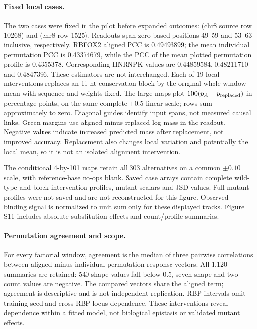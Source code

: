 \documentclass[11pt]{article}
\begin{document}
\paragraph{Fixed local cases.} The two cases were fixed in the pilot before expanded outcomes:  (chr8 source row 10268) and  (chr8 row 1525). Readouts span zero-based positions 49--59 and 53--63 inclusive, respectively. RBFOX2 aligned PCC is 0.49493899; the mean individual permutation PCC is 0.43374679, while the PCC of the mean plotted permutation profile is 0.4355378. Corresponding HNRNPK values are 0.44859584, 0.48211710 and 0.4847396. These estimators are not interchanged. Each of 19 local interventions replaces an 11-nt conservation block by the original whole-window mean with sequence and weights fixed. The large maps plot $100(p_A-p_{\rm replaced})$ in percentage points, on the same complete $\pm0.5$ linear scale; rows sum approximately to zero. Diagonal guides identify input spans, not measured causal links. Green margins use aligned-minus-replaced log mass in the readout. Negative values indicate increased predicted mass after replacement, not improved accuracy. Replacement also changes local variation and potentially the local mean, so it is not an isolated alignment intervention.

The conditional 4-by-101 maps retain all 303 alternatives on a common $\pm0.10$ scale, with reference-base no-ops blank. Saved case arrays contain complete wild-type and block-intervention profiles, mutant scalars and JSD values. Full mutant profiles were not saved and are not reconstructed for this figure. Observed binding signal is normalized to unit sum only for these displayed tracks. Figure S11 includes absolute substitution effects and count/profile summaries.

\paragraph{Permutation agreement and scope.} For every factorial window, agreement is the median of three pairwise correlations between aligned-minus-individual-permutation response vectors. All 1,120 summaries are retained: 540 shape values fall below 0.5, seven shape and two count values are negative. The compared vectors share the aligned term; agreement is descriptive and is not independent replication. RBP intervals omit training-seed and cross-RBP locus dependence. These interventions reveal dependence within a fitted model, not biological epistasis or validated mutant effects.
\end{document}
